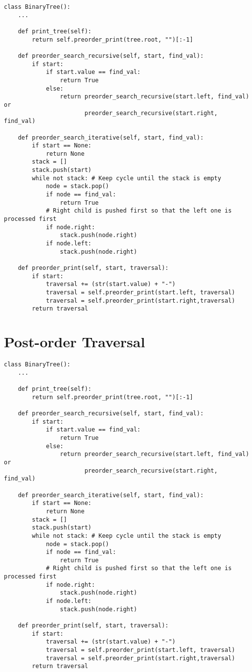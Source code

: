 \begin{lstlisting}[firstnumber=1, caption={Tree operations implementation.}]
class BinaryTree():
	...

	def print_tree(self):
		return self.preorder_print(tree.root, "")[:-1]

	def preorder_search_recursive(self, start, find_val):
		if start:
			if start.value == find_val:
				return True
			else:
				return preorder_search_recursive(start.left, find_val) or
					   preorder_search_recursive(start.right, find_val)

	def preorder_search_iterative(self, start, find_val):
		if start == None:
			return None
		stack = []
		stack.push(start)
		while not stack: # Keep cycle until the stack is empty
			node = stack.pop()
			if node == find_val:
				return True
			# Right child is pushed first so that the left one is processed first
			if node.right:
				stack.push(node.right)
			if node.left:
				stack.push(node.right)

	def preorder_print(self, start, traversal):
		if start:
			traversal += (str(start.value) + "-")
			traversal = self.preorder_print(start.left, traversal)
			traversal = self.preorder_print(start.right,traversal)
		return traversal
\end{lstlisting}

\section{Post-order Traversal}
\label{postorderappendix}

\begin{lstlisting}[firstnumber=1, caption={Tree operations implementation.}]
class BinaryTree():
	...

	def print_tree(self):
		return self.preorder_print(tree.root, "")[:-1]

	def preorder_search_recursive(self, start, find_val):
		if start:
			if start.value == find_val:
				return True
			else:
				return preorder_search_recursive(start.left, find_val) or
					   preorder_search_recursive(start.right, find_val)

	def preorder_search_iterative(self, start, find_val):
		if start == None:
			return None
		stack = []
		stack.push(start)
		while not stack: # Keep cycle until the stack is empty
			node = stack.pop()
			if node == find_val:
				return True
			# Right child is pushed first so that the left one is processed first
			if node.right:
				stack.push(node.right)
			if node.left:
				stack.push(node.right)

	def preorder_print(self, start, traversal):
		if start:
			traversal += (str(start.value) + "-")
			traversal = self.preorder_print(start.left, traversal)
			traversal = self.preorder_print(start.right,traversal)
		return traversal
\end{lstlisting}

